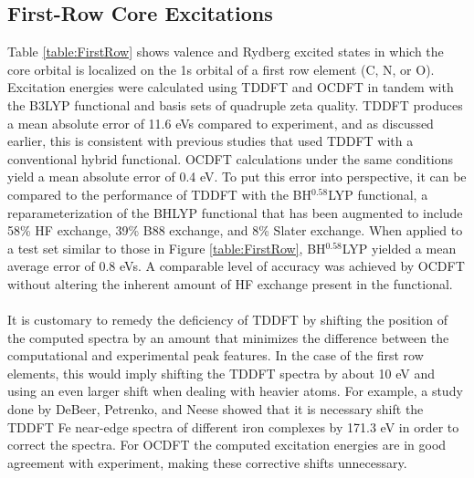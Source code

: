 \documentclass[11.5pt]{article}
\begin{document}
\subsection{First-Row Core Excitations}
\noindent Table \ref{table:FirstRow} shows valence and Rydberg excited states in which the core orbital is localized on the 1s orbital of a first row element (C, N, or O). Excitation energies were calculated using TDDFT and OCDFT in tandem with the B3LYP functional and basis sets of quadruple zeta quality. TDDFT produces a mean absolute error of 11.6 eVs compared to experiment, and as discussed earlier, this is consistent with previous studies that used TDDFT with a conventional hybrid functional.\cite{besley_self-consistent-field_2009} OCDFT calculations under the same conditions yield a mean absolute error of 0.4 eV. To put this error into perspective, it can be compared to the performance of TDDFT with the BH$^{0.58}$LYP functional,\cite{besley_time-dependent_2009} a reparameterization of the BHLYP functional that has been augmented to include 58\% HF exchange, 39\% B88 exchange, and 8\% Slater exchange. When applied to a test set similar to those in Figure \ref{table:FirstRow}, BH$^{0.58}$LYP yielded a mean average error of 0.8 eVs. A comparable level of accuracy was achieved by OCDFT without altering the inherent amount of HF exchange present in the functional.
\\ \\
It is customary to remedy the deficiency of TDDFT by shifting the position of the computed spectra by an amount that minimizes the difference between the computational and experimental peak features. In the case of the first row elements, this would imply shifting the TDDFT spectra by about 10 eV and using an even larger shift when dealing with heavier atoms. For example, a study done by DeBeer, Petrenko, and Neese\cite{debeer_george_prediction_2008} showed that it is necessary shift the TDDFT Fe near-edge spectra of different iron complexes by 171.3 eV in order to correct the spectra. For OCDFT the computed excitation energies are in good agreement with experiment, making these corrective shifts unnecessary.
\\ \\ 
\end{document}
